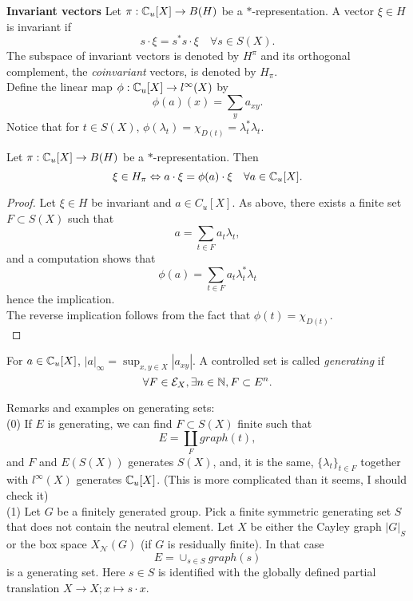 \textbf{Invariant vectors} Let $\pi: \mathbb C_u[X] \rightarrow B(H)$ be a $*$-representation. A vector $\xi\in H$ is invariant if 
\[s\cdot \xi  = s^*s\cdot  \xi \quad\forall s \in S(X).\]
The subspace of invariant vectors is denoted by $H^\pi$ and its orthogonal complement, the \textit{coinvariant} vectors, is denoted by $H_\pi$.\\

Define the linear map $\phi : \mathbb C_u[X]\rightarrow l^\infty(X)$ by
\[\phi(a)(x) = \sum_{y}a_{xy}.\]
Notice that for $t\in S(X)$, $\phi(\lambda_t) = \chi_{D(t)} = \lambda_t^*\lambda_t$.

\begin{prop}
Let $\pi: \mathbb C_u[X] \rightarrow B(H)$ be a $*$-representation. Then 
\[\xi \in H_\pi \Leftrightarrow a\cdot \xi = \phi(a) \cdot \xi \quad \forall a \in \mathbb C_u[X].\]
\end{prop}

\begin{proof}
Let $\xi \in H$ be invariant and $a\in C_u[X]$. As above, there exists a finite set $F\subset S(X)$ such that 
\[ a = \sum_{t\in F} a_t \lambda_t,\]
and a computation shows that 
\[\phi(a) = \sum_{t\in F} a_t \lambda_t^*\lambda_t\]
hence the implication.\\

The reverse implication follows from the fact that $\phi(t) = \chi_{D(t)}$.\\  
\end{proof}

For $a\in \mathbb C_u[X]$, $|a|_\infty = \sup_{x,y\in X} |a_{xy}|$. A controlled set is called \textit{generating} if 
\[\forall F\in \mathcal E_X, \exists n\in \mathbb N , F\subset E^n.\]

Remarks and examples on generating sets:\\

(0) If $E$ is generating, we can find $F\subset S(X)$ finite such that 
\[E = \coprod_F graph(t),\]
and $F$ and $E(S(X))$ generates $S(X)$, and, it is the same, $\{\lambda_t\}_{t\in F}$ together with $l^\infty (X)$ generates $\mathbb C_u[X]$. (This is more complicated than it seems, I should check it)\\
 
(1) Let $G$ be a finitely generated group. Pick a finite symmetric generating set $S$ that does not contain the neutral element. Let $X$ be either the Cayley graph $|G|_S$ or the box space $X_{\mathcal N}(G)$ (if $G$ is residually finite). In that case
\[E =\cup_{s\in S} graph(s)\]
is a generating set. Here $s\in S$ is identified with the globally defined partial translation $X\rightarrow X ; x\mapsto s\cdot x $. \\

